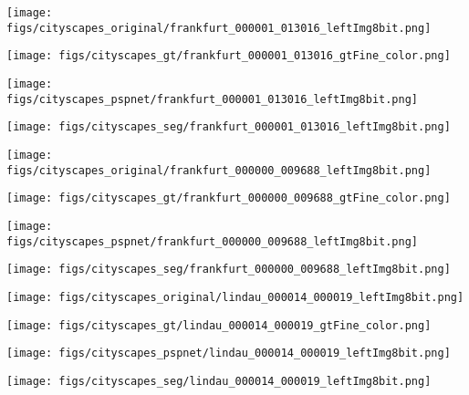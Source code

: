\documentclass[10pt,twocolumn,twoside]{IEEEtran}
\begin{document}
\begin{figure*}[t]\centering
\begin{minipage}{0.23\textwidth}
	\texttt{[image: figs/cityscapes\_original/frankfurt\_000001\_013016\_leftImg8bit.png]}
\end{minipage}
\begin{minipage}{0.23\textwidth}
	\texttt{[image: figs/cityscapes\_gt/frankfurt\_000001\_013016\_gtFine\_color.png]}
\end{minipage}	
\begin{minipage}{0.23\textwidth}	
	\texttt{[image: figs/cityscapes\_pspnet/frankfurt\_000001\_013016\_leftImg8bit.png]}    	
\end{minipage}
\begin{minipage}{0.23\textwidth}
	\texttt{[image: figs/cityscapes\_seg/frankfurt\_000001\_013016\_leftImg8bit.png]}
\end{minipage}

\begin{minipage}{0.23\textwidth}
	\texttt{[image: figs/cityscapes\_original/frankfurt\_000000\_009688\_leftImg8bit.png]}
\end{minipage}
\begin{minipage}{0.23\textwidth}
	\texttt{[image: figs/cityscapes\_gt/frankfurt\_000000\_009688\_gtFine\_color.png]}
\end{minipage}
\begin{minipage}{0.23\textwidth}	
	\texttt{[image: figs/cityscapes\_pspnet/frankfurt\_000000\_009688\_leftImg8bit.png]}    	
\end{minipage}
\begin{minipage}{0.23\textwidth}
	\texttt{[image: figs/cityscapes\_seg/frankfurt\_000000\_009688\_leftImg8bit.png]}
\end{minipage}

\begin{minipage}{0.23\textwidth}
	\texttt{[image: figs/cityscapes\_original/lindau\_000014\_000019\_leftImg8bit.png]}
\end{minipage}
\begin{minipage}{0.23\textwidth}
	\texttt{[image: figs/cityscapes\_gt/lindau\_000014\_000019\_gtFine\_color.png]}
\end{minipage}
\begin{minipage}{0.23\textwidth}	
	\texttt{[image: figs/cityscapes\_pspnet/lindau\_000014\_000019\_leftImg8bit.png]}    	
\end{minipage}
\begin{minipage}{0.23\textwidth}
	\texttt{[image: figs/cityscapes\_seg/lindau\_000014\_000019\_leftImg8bit.png]}
\end{minipage}


\end{figure*}
\end{document}
